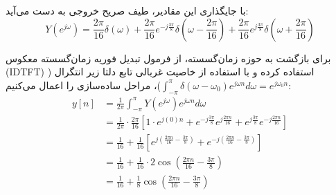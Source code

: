 با جایگذاری این مقادیر، طیف صریح خروجی به دست می‌آید:
\[
Y(e^{j\omega}) = \frac{2\pi}{16} \delta(\omega) + \frac{2\pi}{16} e^{-j\frac{3\pi}{8}} \delta\left(\omega - \frac{2\pi}{16}\right) + \frac{2\pi}{16} e^{j\frac{3\pi}{8}} \delta\left(\omega + \frac{2\pi}{16}\right)
\]

برای بازگشت به حوزه زمان‌گسسته، از فرمول تبدیل فوریه زمان‌گسسته معکوس (IDTFT) استفاده کرده و با استفاده از خاصیت غربالی تابع دلتا زیر انتگرال ($\int_{-\pi}^{\pi} \delta(\omega - \omega_0) e^{j\omega n} d\omega = e^{j\omega_0 n}$)، مراحل ساده‌سازی را اعمال می‌کنیم:
\[
\begin{aligned}
y[n] &= \frac{1}{2\pi} \int_{-\pi}^{\pi} Y(e^{j\omega}) e^{j\omega n} d\omega \\
&= \frac{1}{2\pi} \cdot \frac{2\pi}{16} \left[ 1 \cdot e^{j(0)n} + e^{-j\frac{3\pi}{8}} e^{j\frac{2\pi n}{16}} + e^{j\frac{3\pi}{8}} e^{-j\frac{2\pi n}{16}} \right] \\
&= \frac{1}{16} + \frac{1}{16} \left[ e^{j\left(\frac{2\pi n}{16} - \frac{3\pi}{8}\right)} + e^{-j\left(\frac{2\pi n}{16} - \frac{3\pi}{8}\right)} \right] \\
&= \frac{1}{16} + \frac{1}{16} \cdot 2 \cos\left(\frac{2\pi n}{16} - \frac{3\pi}{8}\right) \\
&= \frac{1}{16} + \frac{1}{8} \cos\left(\frac{2\pi n}{16} - \frac{3\pi}{8}\right)
\end{aligned}
\]